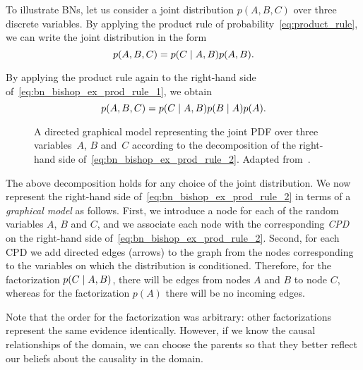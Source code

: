 To illustrate \acp{BN}, let us consider a joint distribution $p(A,B,C)$ over three discrete variables.
By applying the product rule of probability~\eqref{eq:product_rule}, we can write the joint distribution in the form
\begin{equation} \label{eq:bn_bishop_ex_prod_rule_1}
    p(A,B,C) = p(C \mid A,B) p(A,B).
\end{equation}

By applying the product rule again to the right-hand side of~\eqref{eq:bn_bishop_ex_prod_rule_1}, we obtain
\begin{equation} \label{eq:bn_bishop_ex_prod_rule_2}
    p(A,B,C) = p(C \mid A,B) p(B \mid A) p(A).
\end{equation}

\begin{figure}
\centering
{}
\caption[A directed graphical model representing the joint \acf{PDF} over the variables of~\eqref{eq:bn_bishop_ex_prod_rule_2}.]{A directed graphical model representing the joint \acf{PDF} over three variables~$A$, $B$ and~$C$ according to the decomposition of the right-hand side of~\eqref{eq:bn_bishop_ex_prod_rule_2}. Adapted from~\cite{bishop:prml}.}
\label{fig:directed_graphical_model}
\end{figure}

The above decomposition holds for any choice of the joint distribution.
We now represent the right-hand side of~\eqref{eq:bn_bishop_ex_prod_rule_2} in terms of a \emph{graphical model} as follows.
First, we introduce a node for each of the random variables $A$, $B$ and $C$, and we associate each node with the corresponding \emph{\ac{CPD}} on the right-hand side of~\eqref{eq:bn_bishop_ex_prod_rule_2}.
Second, for each \ac{CPD} we add directed edges (arrows) to the graph from the nodes corresponding to the variables on which the distribution is conditioned.
Therefore, for the factorization $p(C \mid A,B)$, there will be edges from nodes $A$ and $B$ to node $C$, whereas for the factorization $p(A)$ there will be no incoming edges.

Note that the order for the factorization was arbitrary: other factorizations represent the same evidence identically.
However, if we know \apriori{} the causal relationships of the domain, we can choose the parents so that they better reflect our beliefs about the causality in the domain.

